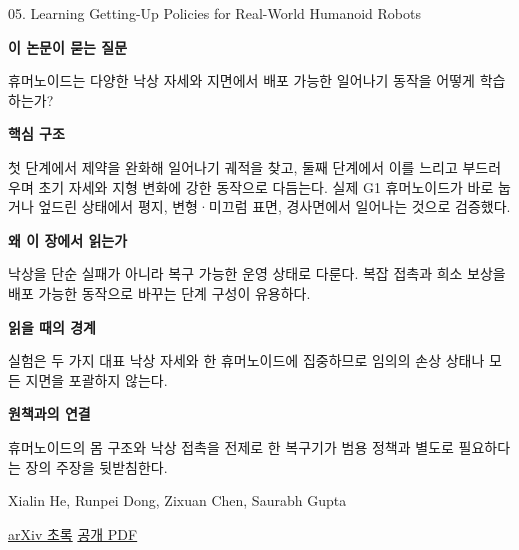 \documentclass[11pt,openany]{book}
\begin{document}
\begin{termcard}{05. Learning Getting-Up Policies for Real-World Humanoid Robots}

\par

\medskip

{\sffamily\bfseries\color{deepblue} 이 논문이 묻는 질문}\par

휴머노이드는 다양한 낙상 자세와 지면에서 배포 가능한 일어나기 동작을 어떻게 학습하는가?

\smallskip

{\sffamily\bfseries\color{deepblue} 핵심 구조}\par

첫 단계에서 제약을 완화해 일어나기 궤적을 찾고, 둘째 단계에서 이를 느리고 부드러우며 초기 자세와 지형 변화에 강한 동작으로 다듬는다. 실제 G1 휴머노이드가 바로 눕거나 엎드린 상태에서 평지, 변형·미끄럼 표면, 경사면에서 일어나는 것으로 검증했다.

\smallskip

{\sffamily\bfseries\color{deepblue} 왜 이 장에서 읽는가}\par

낙상을 단순 실패가 아니라 복구 가능한 운영 상태로 다룬다. 복잡 접촉과 희소 보상을 배포 가능한 동작으로 바꾸는 단계 구성이 유용하다.

\smallskip

{\sffamily\bfseries\color{coral} 읽을 때의 경계}\par

실험은 두 가지 대표 낙상 자세와 한 휴머노이드에 집중하므로 임의의 손상 상태나 모든 지면을 포괄하지 않는다.

\smallskip

{\sffamily\bfseries\color{teal} 원책과의 연결}\par

휴머노이드의 몸 구조와 낙상 접촉을 전제로 한 복구기가 범용 정책과 별도로 필요하다는 장의 주장을 뒷받침한다.

\medskip

{\footnotesize\color{muted} Xialin He, Runpei Dong, Zixuan Chen, Saurabh Gupta\par

\href{https://arxiv.org/abs/2502.12152}{arXiv 초록} \quad \href{https://arxiv.org/pdf/2502.12152}{공개 PDF}\par}

\end{termcard}
\end{document}

